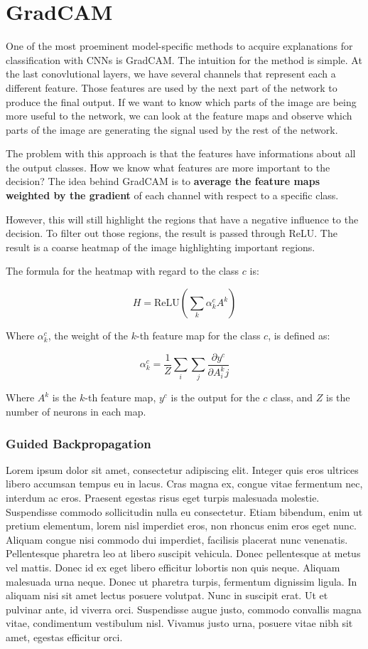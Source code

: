 \chapter{GradCAM}

One of the most proeminent model-specific methods to acquire explanations for classification with CNNs is GradCAM. The intuition for the method is simple. At the last conovlutional layers, we have several channels that represent each a different feature. Those features are used by the next part of the network to produce the final output. If we want to know which parts of the image are being more useful to the network, we can look at the feature maps and observe which parts of the image are generating the signal used by the rest of the network. 

The problem with this approach is that the features have informations about all the output classes. How we know what features are more important to the decision? The idea behind GradCAM is to \textbf{average the feature maps weighted by the gradient} of each channel with respect to a specific class. 

However, this will still highlight the regions that have a negative influence to the decision. To filter out those regions, the result is passed through ReLU. The result is a coarse heatmap of the image highlighting important regions.

The formula for the heatmap with regard to the class $c$ is:

\[
    H  = \text{ReLU}(\sum_k \alpha_k^c A^k)
\]

Where $\alpha_k^c$, the weight of the $k$-th feature map for the class $c$, is defined as:

\[
    \alpha_k^c=\frac{1}{Z} \sum_i \sum_j \frac{\partial y^c}{\partial A^k_ij}
\]

Where $A^k$ is the $k$-th feature map, $y^c$ is the output for the $c$ class, and $Z$ is the number of neurons in each map.

\subsection{Guided Backpropagation}
Lorem ipsum dolor sit amet, consectetur adipiscing elit. Integer quis eros ultrices libero accumsan tempus eu in lacus. Cras magna ex, congue vitae fermentum nec, interdum ac eros. Praesent egestas risus eget turpis malesuada molestie. Suspendisse commodo sollicitudin nulla eu consectetur. Etiam bibendum, enim ut pretium elementum, lorem nisl imperdiet eros, non rhoncus enim eros eget nunc. Aliquam congue nisi commodo dui imperdiet, facilisis placerat nunc venenatis. Pellentesque pharetra leo at libero suscipit vehicula. Donec pellentesque at metus vel mattis. Donec id ex eget libero efficitur lobortis non quis neque. Aliquam malesuada urna neque. Donec ut pharetra turpis, fermentum dignissim ligula. In aliquam nisi sit amet lectus posuere volutpat. Nunc in suscipit erat. Ut et pulvinar ante, id viverra orci. Suspendisse augue justo, commodo convallis magna vitae, condimentum vestibulum nisl. Vivamus justo urna, posuere vitae nibh sit amet, egestas efficitur orci. 
